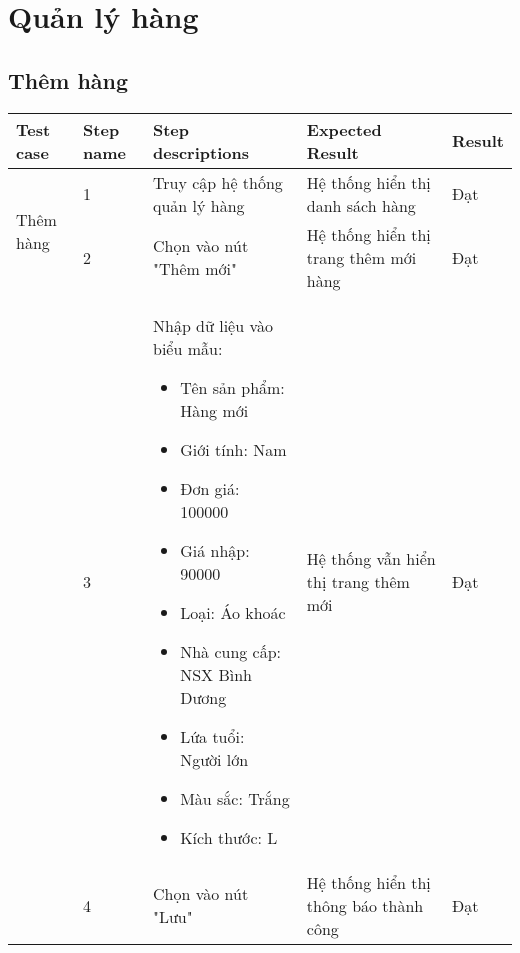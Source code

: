 \section{Quản lý hàng}

\subsection{Thêm hàng}
{
    \setlength\extrarowheight{6pt}
    \begin{longtable}{| p{2.5cm}| p{1cm}| p{5.5cm}| p{4.5cm} | p{1.5cm} |}
        \hline
        \textbf{Test case} & \textbf{Step name} & \textbf{Step descriptions} & \textbf{Expected Result} & \textbf{Result} \\
        \hline
        \multirow[t]{2}{2.5cm}{Thêm hàng} & 1 & Truy cập hệ thống quản lý hàng & Hệ thống hiển thị danh sách hàng & Đạt \\
        \cline{2-5}
         & 2 & Chọn vào nút "Thêm mới" & Hệ thống hiển thị trang thêm mới hàng & Đạt \\
        \cline{2-5}
        & 3 & Nhập dữ liệu vào biểu mẫu:
        \begin{itemize}
            \item Tên sản phẩm: Hàng mới
            \item Giới tính: Nam
            \item Đơn giá: 100000
            \item Giá nhập: 90000
            \item Loại: Áo khoác
            \item Nhà cung cấp: NSX Bình Dương
            \item Lứa tuổi: Người lớn
            \item Màu sắc: Trắng
            \item Kích thước: L
        \end{itemize} & Hệ thống vẫn hiển thị trang thêm mới & Đạt \\
        \cline{2-5}
         & 4 & Chọn vào nút "Lưu" & Hệ thống hiển thị thông báo thành công & Đạt \\
        \hline
    \end{longtable} 
}


